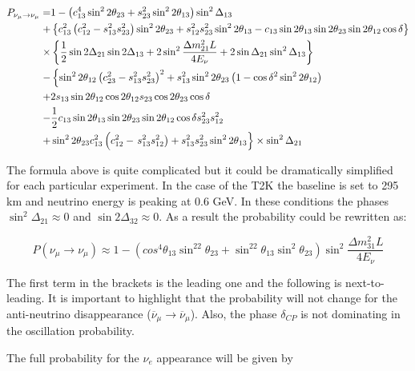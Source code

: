 \documentclass[../main.tex]{subfiles}
\begin{document}
\begin{equation}
\begin{split}
P_{\nu_\mu\to\nu_\mu}=&1-\left(c^4_{13}\sin^22\theta_{23} + s^2_{23}\sin^22\theta_{13}\right)\sin^2\Delta_{13} \\
+&\left\{c_{13}^2\left(c^2_{12}-s^2_{13}s^2_{23}\right)\sin^22\theta_{23}+s^2_{12}s^2_{23}\sin^22\theta_{13}-c_{13}\sin2\theta_{13}\sin2\theta_{23}\sin2\theta_{12}\cos\delta\right\} \\
\times&\left\{\frac{1}{2}\sin2\Delta_{21}\sin2\Delta_{13}+2\sin^2\frac{\Delta m_{21}^2L}{4E_\nu} + 2\sin\Delta_{21}\sin^2\Delta_{13}\right\} \\
-&\left\{\sin^22\theta_{12}\left(c^2_{23}-s^2_{13}s^2_{23}\right)^2+s_{13}^2\sin^22\theta_{23}\left(1-\cos\delta^2\sin^22\theta_{12}\right) \right.\\
+&2s_{13}\sin2\theta_{12}\cos2\theta_{12}s_{23}\cos2\theta_{23}\cos\delta \\
-&\frac{1}{2}c_{13}\sin2\theta_{13}\sin2\theta_{23}\sin2\theta_{12}\cos\delta s^2_{23}s^2_{12} \\
 +&\sin^22\theta_{23}c^2_{13}\left(c^2_{12}-\left. {}s^2_{13}s^2_{12}\right)+s^2_{13}s^2_{23}\sin^22\theta_{13} \vphantom{\left(\sin^22\theta_{12}\right)^2} \right\}\times\sin^2\Delta_{21}
\end{split}
\label{eq:intro:disapp_p}
\end{equation}

The formula above is quite complicated but it could be dramatically simplified for each particular experiment. In the case of the T2K the baseline is set to 295 km and neutrino energy is peaking at 0.6 GeV. In these conditions the phases $\sin^2\Delta_{21}\approx0$ and $\sin2\Delta_{32}\approx0$. As a result the probability could be rewritten as:

\begin{equation}
\label{eq:intro:numu_simple}
P\left(\nu_\mu\to\nu_\mu\right)\approx1-\left(cos^4\theta_{13}\sin^22\theta_{23}+\sin^22\theta_{13}\sin^2\theta_{23}\right)\sin^2\frac{\Delta m^2_{31}L}{4E_\nu}
\end{equation}

The first term in the brackets is the leading one and the following is next-to-leading. It is important to highlight that the probability will not change for the anti-neutrino disappearance ($\overline{\nu}_\mu\to\overline{\nu}_\mu$). Also, the phase $\delta_{CP}$ is not dominating in the oscillation probability.

The full probability for the $\nu_e$ appearance will be given by
\end{document}
